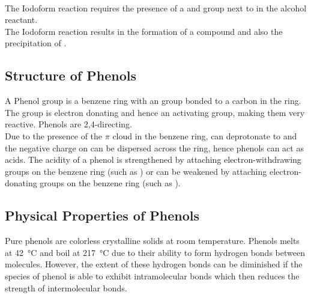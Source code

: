 \documentclass[../main]{subfiles}
\begin{document}
	 \\

	The Iodoform reaction requires the presence of a  and  group next to  in the alcohol reactant. \\

	The Iodoform reaction results in the formation of a  compound and also the precipitation of . \\

	\subsection{Structure of Phenols}

	A Phenol group is a benzene ring with an  group bonded to a carbon in the ring. \\

	The  group is electron donating and hence an activating group, making them very reactive. Phenols are 2,4-directing. \\

	Due to the presence of the \(\pi\)  cloud in the benzene ring,  can deprotonate to  and the negative charge on  can be dispersed across the ring, hence phenols can act as acids. The acidity of a phenol is strengthened by attaching electron-withdrawing groups on the benzene ring (such as ) or can be weakened by attaching electron-donating groups on the benzene ring (such as ).

	\subsection{Physical Properties of Phenols}

	Pure phenols are colorless crystalline solids at room temperature. Phenols melts at \SI{42}{\celsius} and boil at \SI{217}{\celsius} due to their ability to form hydrogen bonds between molecules. However, the extent of these hydrogen bonds can be diminished if the species of phenol is able to exhibit intramolecular  bonds which then reduces the strength of intermolecular bonds.
\end{document}
